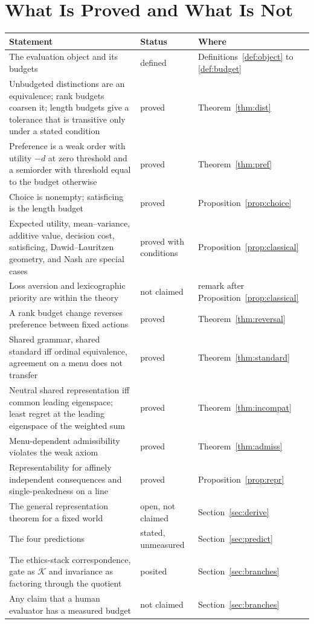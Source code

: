 \documentclass[11pt]{article}
\theoremstyle{definition}
\theoremstyle{remark}
\newcommand{\K}{\mathcal{K}}
\begin{document}
\section{What Is Proved and What Is Not}

\begin{center}
\small
\begin{tabular}{p{} p{} p{}}
\toprule
Statement & Status & Where \\
\midrule
The evaluation object and its budgets & defined & Definitions~\ref{def:object} to \ref{def:budget} \\
Unbudgeted distinctions are an equivalence; rank budgets coarsen it; length budgets give a tolerance that is transitive only under a stated condition & proved & Theorem~\ref{thm:dist} \\
Preference is a weak order with utility $-d$ at zero threshold and a semiorder with threshold equal to the budget otherwise & proved & Theorem~\ref{thm:pref} \\
Choice is nonempty; satisficing is the length budget & proved & Proposition~\ref{prop:choice} \\
Expected utility, mean--variance, additive value, decision cost, satisficing, Dawid--Lauritzen geometry, and Nash are special cases & proved with conditions & Proposition~\ref{prop:classical} \\
Loss aversion and lexicographic priority are within the theory & not claimed & remark after Proposition~\ref{prop:classical} \\
A rank budget change reverses preference between fixed actions & proved & Theorem~\ref{thm:reversal} \\
Shared grammar, shared standard iff ordinal equivalence, agreement on a menu does not transfer & proved & Theorem~\ref{thm:standard} \\
Neutral shared representation iff common leading eigenspace; least regret at the leading eigenspace of the weighted sum & proved & Theorem~\ref{thm:incompat} \\
Menu-dependent admissibility violates the weak axiom & proved & Theorem~\ref{thm:admiss} \\
Representability for affinely independent consequences and single-peakedness on a line & proved & Proposition~\ref{prop:repr} \\
The general representation theorem for a fixed world & open, not claimed & Section~\ref{sec:derive} \\
The four predictions & stated, unmeasured & Section~\ref{sec:predict} \\
The ethics-stack correspondence, gate as $\K$ and invariance as factoring through the quotient & posited & Section~\ref{sec:branches} \\
Any claim that a human evaluator has a measured budget & not claimed & Section~\ref{sec:branches} \\
\bottomrule
\end{tabular}
\end{center}
\end{document}
